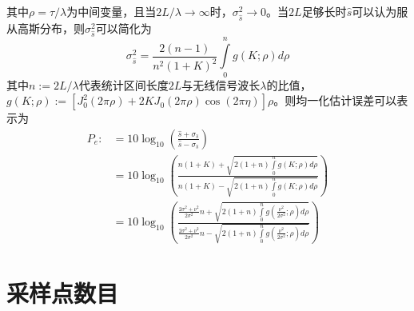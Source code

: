 其中$\rho=\tau/\lambda$为中间变量，且当$2L/\lambda\rightarrow\infty$时，$\sigma_{\hat{s}}^2\rightarrow0$。当$2L$足够长时$\hat{s}$可以认为服从高斯分布，则$\sigma_{\hat{s}}^2$可以简化为
\begin{equation}
\sigma_{\hat{s}}^2=\frac{2(n-1)}{n^2(1+K)^2}\int\limits_0^n g(K;\rho) d\rho
\label{app:sigmareplace}
\end{equation}
其中$n:=2L/\lambda$代表统计区间长度$2L$与无线信号波长$\lambda$的比值，$g(K;\rho):=[J_0^2(2\pi \rho)+2KJ_0(2\pi \rho)\cos(2\pi \eta)]\rho$。则均一化估计误差可以表示为
\begin{equation}
\begin{split}
P_e:&=10 \log_{10}\left(\frac{\hat{s}+\sigma_{\hat{s}}}{\hat{s}-\sigma_{\hat{s}}}\right) \\
    &=10 \log_{10}\left(\frac{n(1+K)+\sqrt{2(1+n)\int\limits_0^n g(K;\rho) d\rho}}{n(1+K)-\sqrt{2(1+n)\int\limits_0^n g(K;\rho) d\rho}}\right) \\
    &= 10 \log_{10}\left(\frac{\frac{2\sigma^2+\nu^2}{2\sigma^2}n+\sqrt{2(1+n)\int\limits_0^n g\left(\frac{\nu^2}{2\sigma^2};\rho\right) d\rho}}{\frac{2\sigma^2+\nu^2}{2\sigma^2}n-\sqrt{2(1+n)\int\limits_0^n g\left(\frac{\nu^2}{2\sigma^2};\rho\right) d\rho}}\right)
\end{split}
\label{app:Perror}
\end{equation}


\section{采样点数目}
\label{appsec:numberestimation}

